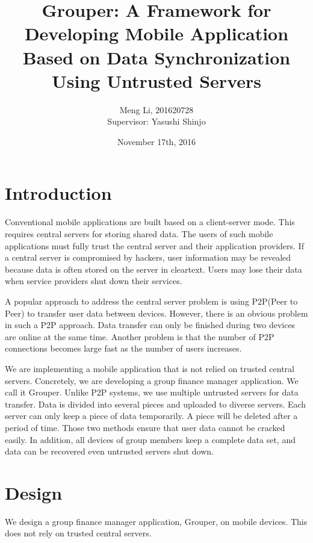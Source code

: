\documentclass[twocolumn,10pt]{article}
\begin{document}
\date{November 17th, 2016}

\title{\bf Grouper: A Framework for Developing Mobile Application Based on Data Synchronization Using Untrusted Servers}

\author{
	Meng Li, 201620728  
	\\ Supervisor: Yasushi Shinjo
}

\maketitle

\section{Introduction}
Conventional mobile applications are built based on a client-server mode. This requires central servers for storing shared data. The users of such mobile applications must fully trust the central server and their application providers. If a central server is compromised by hackers, user information may be revealed because data is often stored on the server in cleartext. Users may lose their data when service providers shut down their services. 

A popular approach to address the central server problem is using P2P(Peer to Peer) to transfer user data between devices. However, there is an obvious problem in such a P2P approach. Data transfer can only be finished during two devices are online at the same time. Another problem is that the number of P2P connections becomes large  fast as the number of users increases. 

We are implementing a mobile application that is not relied on trusted central servers. Concretely, we are developing a group finance manager application. We call it Grouper. Unlike P2P systems, we use multiple untrusted servers for data transfer. Data is divided into several pieces and uploaded to diverse servers. Each server can only keep a piece of data temporarily. A piece will be deleted after a period of time. Those two methods ensure that user data cannot be cracked easily. In addition, all devices of group members keep a complete data set, and data can be recovered even untrusted servers shut down.

\section{Design}

We design a group finance manager application, Grouper, on mobile devices. This does not rely on trusted central servers. 
\end{document}
